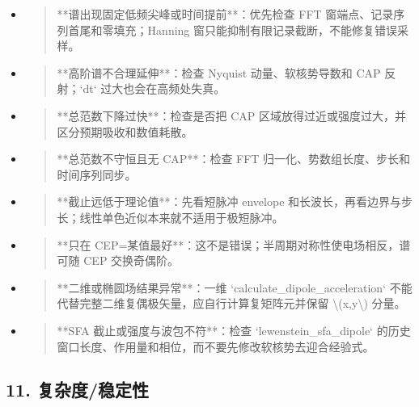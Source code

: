 \documentclass[UTF8,openany,11pt,fontset=fandol]{ctexbook}
\begin{document}
\begin{itemize}
\item
  \begin{quote}
  **谱出现固定低频尖峰或时间提前**：优先检查 FFT
  窗端点、记录序列首尾和零填充；Hanning
  窗只能抑制有限记录截断，不能修复错误采样。
  \end{quote}
\item
  \begin{quote}
  **高阶谱不合理延伸**：检查 Nyquist 动量、软核势导数和 CAP 反射；`dt`
  过大也会在高频处失真。
  \end{quote}
\item
  \begin{quote}
  **总范数下降过快**：检查是否把 CAP
  区域放得过近或强度过大，并区分预期吸收和数值耗散。
  \end{quote}
\item
  \begin{quote}
  **总范数不守恒且无 CAP**：检查 FFT
  归一化、势数组长度、步长和时间序列同步。
  \end{quote}
\item
  \begin{quote}
  **截止远低于理论值**：先看短脉冲 envelope
  和长波长，再看边界与步长；线性单色近似本来就不适用于极短脉冲。
  \end{quote}
\item
  \begin{quote}
  **只在 CEP=某值最好**：这不是错误；半周期对称性使电场相反，谱可随 CEP
  交换奇偶阶。
  \end{quote}
\item
  \begin{quote}
  **二维或椭圆场结果异常**：一维 `calculate\_dipole\_acceleration`
  不能代替完整二维复偶极矢量，应自行计算复矩阵元并保留
  \textbackslash(x,y\textbackslash) 分量。
  \end{quote}
\item
  \begin{quote}
  **SFA 截止或强度与波包不符**：检查 `lewenstein\_sfa\_dipole`
  的历史窗口长度、作用量和相位，而不要先修改软核势去迎合经验式。
  \end{quote}
\end{itemize}

\subsection{\texorpdfstring{\textbf{11.
复杂度/稳定性}}{11. 复杂度/稳定性}}\label{ux590dux6742ux5ea6ux7a33ux5b9aux6027-1}
\end{document}

